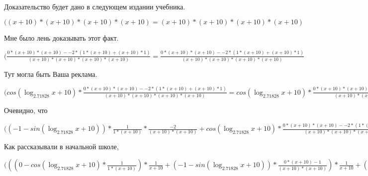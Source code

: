 \documentclass[12pt,a4paper,fleqn]{article}
\theoremstyle{definition}
\begin{document}
Доказательство будет дано в следующем издании учебника.

$(( x  +  10 ) * ( x  +  10 ) * ( x  +  10 ) * ( x  +  10 ) = ( x  +  10 ) * ( x  +  10 ) * ( x  +  10 ) * ( x  +  10 )$

Мне было лень доказывать этот факт.

$(\frac{ 0  * ( x  +  10 ) * ( x  +  10 ) -  -2  * ( 1  * ( x  +  10 ) + ( x  +  10 ) *  1 )}{( x  +  10 ) * ( x  +  10 ) * ( x  +  10 ) * ( x  +  10 )}
 = \frac{ 0  * ( x  +  10 ) * ( x  +  10 ) -  -2  * ( 1  * ( x  +  10 ) + ( x  +  10 ) *  1 )}{( x  +  10 ) * ( x  +  10 ) * ( x  +  10 ) * ( x  +  10 )}
$

Тут могла быть Ваша реклама.

$(cos(\log_{ 2.71828 }{ x  +  10 }) * \frac{ 0  * ( x  +  10 ) * ( x  +  10 ) -  -2  * ( 1  * ( x  +  10 ) + ( x  +  10 ) *  1 )}{( x  +  10 ) * ( x  +  10 ) * ( x  +  10 ) * ( x  +  10 )}
 = cos(\log_{ 2.71828 }{ x  +  10 }) * \frac{ 0  * ( x  +  10 ) * ( x  +  10 ) -  -2  * ( 1  * ( x  +  10 ) + ( x  +  10 ) *  1 )}{( x  +  10 ) * ( x  +  10 ) * ( x  +  10 ) * ( x  +  10 )}
$

Очевидно, что

$(( -1  - sin(\log_{ 2.71828 }{ x  +  10 })) * \frac{ 1 }{ 1  * ( x  +  10 )}
 * \frac{ -2 }{( x  +  10 ) * ( x  +  10 )}
 + cos(\log_{ 2.71828 }{ x  +  10 }) * \frac{ 0  * ( x  +  10 ) * ( x  +  10 ) -  -2  * ( 1  * ( x  +  10 ) + ( x  +  10 ) *  1 )}{( x  +  10 ) * ( x  +  10 ) * ( x  +  10 ) * ( x  +  10 )}
 = ( -1  - sin(\log_{ 2.71828 }{ x  +  10 })) * \frac{ 1 }{ 1  * ( x  +  10 )}
 * \frac{ -2 }{( x  +  10 ) * ( x  +  10 )}
 + cos(\log_{ 2.71828 }{ x  +  10 }) * \frac{ 0  * ( x  +  10 ) * ( x  +  10 ) -  -2  * ( 1  * ( x  +  10 ) + ( x  +  10 ) *  1 )}{( x  +  10 ) * ( x  +  10 ) * ( x  +  10 ) * ( x  +  10 )}
$

Как рассказывали в начальной школе,

$((( 0  - cos(\log_{ 2.71828 }{ x  +  10 }) * \frac{ 1 }{ 1  * ( x  +  10 )}
) * \frac{ 1 }{ x  +  10 }
 + ( -1  - sin(\log_{ 2.71828 }{ x  +  10 })) * \frac{ 0  * ( x  +  10 ) -  1 }{( x  +  10 ) * ( x  +  10 )}
) * \frac{ 1 }{ x  +  10 }
 + ( -1  - sin(\log_{ 2.71828 }{ x  +  10 })) * \frac{ 1 }{ x  +  10 }
 * \frac{ 0  * ( x  +  10 ) -  1 }{( x  +  10 ) * ( x  +  10 )}
 + ( -1  - sin(\log_{ 2.71828 }{ x  +  10 })) * \frac{ 1 }{ 1  * ( x  +  10 )}
 * \frac{ -2 }{( x  +  10 ) * ( x  +  10 )}
 + cos(\log_{ 2.71828 }{ x  +  10 }) * \frac{ 0  * ( x  +  10 ) * ( x  +  10 ) -  -2  * ( 1  * ( x  +  10 ) + ( x  +  10 ) *  1 )}{( x  +  10 ) * ( x  +  10 ) * ( x  +  10 ) * ( x  +  10 )}
 = (( 0  - cos(\log_{ 2.71828 }{ x  +  10 }) * \frac{ 1 }{ 1  * ( x  +  10 )}
) * \frac{ 1 }{ x  +  10 }
 + ( -1  - sin(\log_{ 2.71828 }{ x  +  10 })) * \frac{ 0  * ( x  +  10 ) -  1 }{( x  +  10 ) * ( x  +  10 )}
) * \frac{ 1 }{ x  +  10 }
 + ( -1  - sin(\log_{ 2.71828 }{ x  +  10 })) * \frac{ 1 }{ x  +  10 }
 * \frac{ 0  * ( x  +  10 ) -  1 }{( x  +  10 ) * ( x  +  10 )}
 + ( -1  - sin(\log_{ 2.71828 }{ x  +  10 })) * \frac{ 1 }{ 1  * ( x  +  10 )}
 * \frac{ -2 }{( x  +  10 ) * ( x  +  10 )}
 + cos(\log_{ 2.71828 }{ x  +  10 }) * \frac{ 0  * ( x  +  10 ) * ( x  +  10 ) -  -2  * ( 1  * ( x  +  10 ) + ( x  +  10 ) *  1 )}{( x  +  10 ) * ( x  +  10 ) * ( x  +  10 ) * ( x  +  10 )}
$
\end{document}
